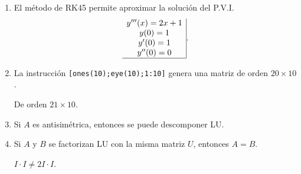 \documentclass[11pt]{article}
\begin{document}
\begin{enumerate}
\begin{enumerate}
\begin{minipage}{0.4\textwidth}
    \end{minipage}
%
\item
{} 
    \begin{minipage}{0.4\textwidth}
	El método de RK45 permite aproximar la soluci\'on del P.V.I. 
    $$
    \begin{array}{c|}
    y'''(x)=2x+1\\
    y(0)=1  \\
    y'(0)=1 \\
    y''(0)=0\\ \hline
    \end{array}.
    $$
    \end{minipage} 
    \begin{minipage}{0.4\textwidth}
    \end{minipage}
%
\item
{} 
    \begin{minipage}{0.4\textwidth}
	La instrucci\'on 
    \texttt{[ones(10);eye(10);1:10]}
    genera una matriz de orden $20\times10$.
    \end{minipage} 
    \begin{minipage}{0.4\textwidth}
    De orden $21\times 10$.
    
    \end{minipage}
\item
{} 
    \begin{minipage}{0.4\textwidth}
	Si $A$ es antisim\'etrica, entonces se puede descomponer LU.
    \end{minipage} 
    \begin{minipage}{0.4\textwidth}
    \end{minipage}
%
\item
{} 
    \begin{minipage}{0.4\textwidth}
	Si $A$ y $B$ se factorizan LU con la misma matriz $U$, entonces $A=B$.
	\end{minipage} 
    \begin{minipage}{0.4\textwidth}
    $I\cdot I\neq 2I\cdot I$.
    \end{minipage}
\end{enumerate}


\end{enumerate}
\end{document}
